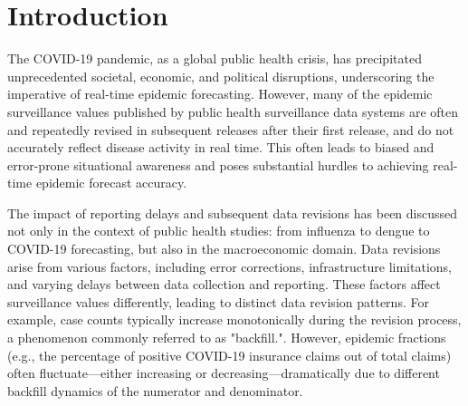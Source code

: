 \section{Introduction}
The COVID-19 pandemic, as a global public health crisis, has precipitated unprecedented societal, economic, and political disruptions, underscoring the imperative of real-time epidemic forecasting. However, many of the epidemic surveillance values published by public health surveillance data systems are often and repeatedly revised in subsequent releases after their first release, and do not accurately reflect disease activity in real time. This often leads to biased and error-prone situational awareness\cite{McGough2020}\cite{Rosenfeld2021} and poses substantial hurdles to achieving real-time epidemic forecast accuracy.

The impact of reporting delays and subsequent data revisions has been discussed not only in the context of public health studies: from influenza\cite{chakraborty2018know} to dengue \cite{rangarajan2019forecasting} to COVID-19 forecasting\cite{rodriguez2021deepcovid}\cite{adiga2020mathematical}, but also in the macroeconomic domain\cite{clements2019data}. Data revisions arise from various factors, including error corrections, infrastructure limitations, and varying delays between data collection and reporting\cite{reich2019collaborative}\cite{Chakraborty2018}. These factors affect surveillance values differently, leading to distinct data revision patterns. For example, case counts typically increase monotonically during the revision process, a phenomenon commonly referred to as "backfill.". However, epidemic fractions (e.g., the percentage of positive COVID-19 insurance claims out of total claims) often fluctuate—either increasing or decreasing—dramatically due to different backfill dynamics of the numerator and denominator.

